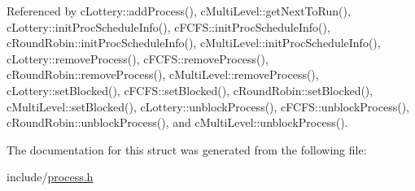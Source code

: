 \-Referenced by c\-Lottery\-::add\-Process(), c\-Multi\-Level\-::get\-Next\-To\-Run(), c\-Lottery\-::init\-Proc\-Schedule\-Info(), c\-F\-C\-F\-S\-::init\-Proc\-Schedule\-Info(), c\-Round\-Robin\-::init\-Proc\-Schedule\-Info(), c\-Multi\-Level\-::init\-Proc\-Schedule\-Info(), c\-Lottery\-::remove\-Process(), c\-F\-C\-F\-S\-::remove\-Process(), c\-Round\-Robin\-::remove\-Process(), c\-Multi\-Level\-::remove\-Process(), c\-Lottery\-::set\-Blocked(), c\-F\-C\-F\-S\-::set\-Blocked(), c\-Round\-Robin\-::set\-Blocked(), c\-Multi\-Level\-::set\-Blocked(), c\-Lottery\-::unblock\-Process(), c\-F\-C\-F\-S\-::unblock\-Process(), c\-Round\-Robin\-::unblock\-Process(), and c\-Multi\-Level\-::unblock\-Process().



\-The documentation for this struct was generated from the following file\-:\begin{DoxyCompactItemize}
\item 
include/\hyperlink{process_8h}{process.\-h}\end{DoxyCompactItemize}

